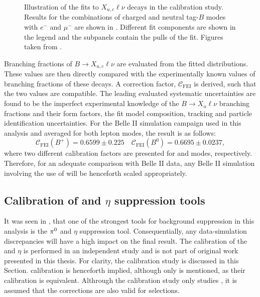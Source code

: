 \begin{figure}[htbp!]
{{        }
    }
    \caption{\label{fig:fei_calib} Illustration of the fits to \B\to$X_{u,c}\ell\nu$ decays in the \FEI calibration study.
    Results for the combinations of charged and neutral tag-$B$ modes with $e^-$ and $\mu^-$
    are shown in .
    Different fit components are shown in the legend and the subpanels contain the pulls of the fit.
    Figures taken from \cite{Belle-II:2020fst}.
    }
\end{figure}

Branching fractions of $B\rightarrow X_{u,c}\ell\nu$ are evaluated from the fitted distributions.
These values are then directly compared with the experimentally known values of branching fractions of these decays.
A correction factor, $\mathcal{C}_{\mathrm{FEI}}$ is derived, such that the two values are compatible.
The leading evaluated systematic uncertainties are found to be the imperfect experimental knowledge of the $B\rightarrow X_u\ell\nu$ branching fractions and their form factors, the fit model composition, tracking and particle identification uncertainties.
For the Belle II simulation campaign used in this analysis and averaged for both lepton modes, the result is as follows:
\begin{equation}\label{eq:fei_calibration}
    \mathcal{C}_{\mathrm{FEI}}(B^+) = 0.6599 \pm 0.225 \quad \mathcal{C}_{\mathrm{FEI}}(B^0) = 0.6695 \pm 0.0237,
\end{equation}
where two different calibration factors are presented for \feiBp and \feiBz modes, respectively.
Therefore, for an adequate comparison with Belle II data, any Belle II simulation involving the use of \FEI will be henceforth scaled appropriately.

\subsection{Calibration of \texorpdfstring{\piz}{pi0} and \texorpdfstring{$\eta$}{eta} suppression tools}\label{sec:piz_eta_calibration}
It was seen in , that one of the strongest tools for background suppression in this analysis is the $\pi^0$ and $\eta$ suppression tool.
Consequentially, any data-simulation discrepancies will have a high impact on the final result.
The calibration of the \piz and $\eta$ is performed in an independent study and is not part of original work presented in this thesis.
For clarity, the calibration study is discussed in this Section.
\etaVeto calibration is henceforth implied, although only \piVeto is mentioned, as their calibration is equivalent.
Althrough the calibration study only studies \piVeto, it is assumed that the corrections are also valid for \etaVeto selections.

